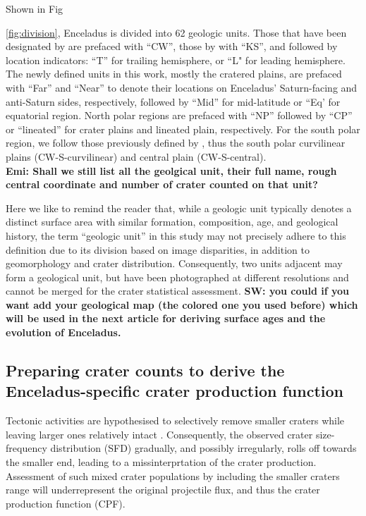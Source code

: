\documentclass[preprint,11pt,3p,times,authoryear]{elsarticle}
\begin{document}
Shown in Fig~{\ref{fig:division}, Enceladus is divided into 62 geologic units. Those that have been designated by \citet{CrowWillard2015} are prefaced with ``CW'', those by \citet{Kirchoff2009} with ``KS'', and followed by location indicators: ``T'' for trailing hemisphere, or ``L" for leading hemisphere. The newly defined units in this work, mostly the cratered plains, are prefaced with ``Far'' and ``Near'' to denote their locations on Enceladus' Saturn-facing and anti-Saturn sides, respectively, followed by ``Mid'' for mid-latitude or ``Eq’ for equatorial region. North polar regions are prefaced with ``NP'' followed by ``CP'' or ``lineated'' for crater plains and lineated plain, respectively. For the south polar region, we follow those previously defined by \citet{CrowWillard2015}, thus the south polar curvilinear plains (CW-S-curvilinear) and central plain (CW-S-central). \\
\textbf{Emi: Shall we still list all the geolgical unit, their full name, rough central coordinate and number of crater counted on that unit?}

Here we like to remind the reader that, while a geologic unit typically denotes a distinct surface area with similar formation, composition, age, and geological history, the term ``geologic unit'' in this study may not precisely adhere to this definition due to its division based on image disparities, in addition to geomorphology and crater distribution. Consequently, two units adjacent may form a geological unit, but have been photographed at different resolutions and cannot be merged for the crater statistical assessment. 
\textbf{SW: you could if you want add your geological map (the colored one you used before) which will be used in the next article for deriving surface ages and the evolution of Enceladus.}

\subsection{Preparing crater counts to derive the Enceladus-specific crater production function}
\label{subsec:cpf}
Tectonic activities are hypothesised to selectively remove smaller craters while leaving larger ones relatively intact \citep{Michael2010}. Consequently, the observed crater size-frequency distribution (SFD) gradually, and possibly irregularly, rolls off towards the smaller end, leading to a missinterprtation of the crater production.
Assessment of such mixed crater populations by including the smaller craters range will underrepresent the original projectile flux, and thus the crater production function (CPF).

}
\end{document}
